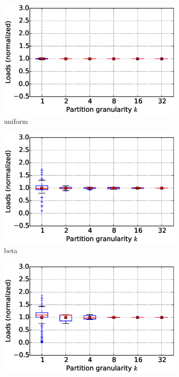 \begin{figure}[!htbp]
\begin{subfigure}[b]{0.45\textwidth}
    \includegraphics[width=\linewidth]{figures/E45_simulation_imbalance_fine_std_uniform.eps}
    \caption{uniform}
\end{subfigure}
\begin{subfigure}[b]{0.45\textwidth}
    \includegraphics[width=\linewidth]{figures/E45_simulation_imbalance_fine_std_beta.eps}
    \caption{beta}
\end{subfigure}
\begin{subfigure}[b]{0.45\textwidth}
    \includegraphics[width=\linewidth]{figures/E45_simulation_imbalance_fine_std_powerlaw.eps}

\end{subfigure}
\end{figure}
